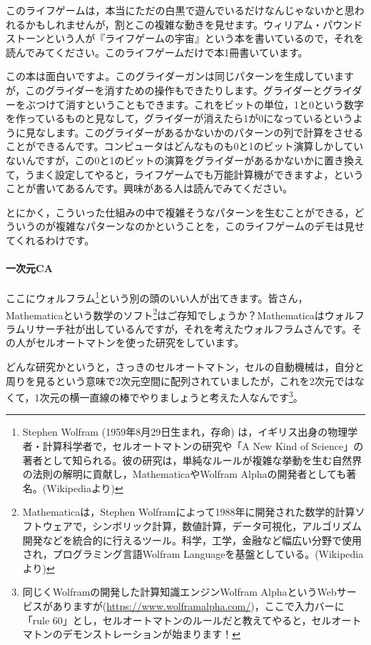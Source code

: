 \documentclass{ltjsbook}
\begin{document}
このライフゲームは，本当にただの白黒で遊んでいるだけなんじゃないかと思われるかもしれませんが，割とこの複雑な動きを見せます。ウィリアム・パウンドストーンという人が『ライフゲームの宇宙』という本\parencite{LifegaeNoUchu}を書いているので，それを読んでみてください。このライフゲームだけで本1冊書いています。

この本は面白いですよ。このグライダーガンは同じパターンを生成していますが，このグライダーを消すための操作もできたりします。グライダーとグライダーをぶつけて消すということもできます。これをビットの単位，1と0という数字を作っているものと見なして，グライダーが消えたら1が0になっているというように見なします。このグライダーがあるかないかのパターンの列で計算をさせることができるんです。コンピュータはどんなものも0と1のビット演算しかしていないんですが，この0と1のビットの演算をグライダーがあるかないかに置き換えて，うまく設定してやると，ライフゲームでも万能計算機ができますよ，ということが書いてあるんです。興味がある人は読んでみてください。

とにかく，こういった仕組みの中で複雑そうなパターンを生むことができる，どういうのが複雑なパターンなのかということを，このライフゲームのデモは見せてくれるわけです。

\paragraph{一次元CA}

ここにウォルフラム\footnote{Stephen Wolfram (1959年8月29日生まれ，存命) は，イギリス出身の物理学者・計算科学者で，セルオートマトンの研究や「A New Kind of Science」の著者として知られる。彼の研究は，単純なルールが複雑な挙動を生む自然界の法則の解明に貢献し，MathematicaやWolfram Alphaの開発者としても著名。(Wikipediaより)}という別の頭のいい人が出てきます。皆さん，Mathematicaという数学のソフト\footnote{Mathematicaは，Stephen Wolframによって1988年に開発された数学的計算ソフトウェアで，シンボリック計算，数値計算，データ可視化，アルゴリズム開発などを統合的に行えるツール。科学，工学，金融など幅広い分野で使用され，プログラミング言語Wolfram Languageを基盤としている。(Wikipediaより)}はご存知でしょうか？Mathematicaはウォルフラムリサーチ社が出しているんですが，それを考えたウォルフラムさんです。その人がセルオートマトンを使った研究をしています。

どんな研究かというと，さっきのセルオートマトン，セルの自動機械は，自分と周りを見るという意味で2次元空間に配列されていましたが，これを2次元ではなくて，1次元の横一直線の棒でやりましょうと考えた人なんです\footnote{同じくWolframの開発した計算知識エンジンWolfram AlphaというWebサービスがありますが(\url{https://www.wolframalpha.com/})，ここで入力バーに「rule 60」とし，セルオートマトンのルールだと教えてやると，セルオートマトンのデモンストレーションが始まります！}。
\end{document}
